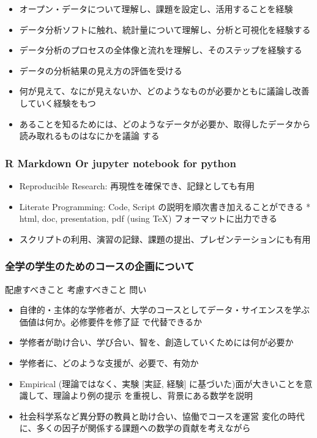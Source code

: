 \documentclass[
]{book}
\providecommand{\tightlist}{%
  \setlength{\itemsep}{0pt}\setlength{\parskip}{0pt}}
\theoremstyle{definition}
\theoremstyle{definition}
\theoremstyle{definition}
\theoremstyle{definition}
\theoremstyle{remark}
\begin{document}
\begin{itemize}
\tightlist
\item
  オープン・データについて理解し、課題を設定し、活用することを経験
\item
  データ分析ソフトに触れ、統計量について理解し、分析と可視化を経験する
\item
  データ分析のプロセスの全体像と流れを理解し、そのステップを経験する
\item
  データの分析結果の見え方の評価を受ける
\item
  何が見えて、なにが見えないか、どのようなものが必要かともに議論し改善していく経験をもつ
\item
  あることを知るためには、どのようなデータが必要か、取得したデータから読み取れるものはなにかを議論 する
\end{itemize}

\hypertarget{r-markdown-or-jupyter-notebook-for-python}{%
\subsubsection{R Markdown Or jupyter notebook for python}\label{r-markdown-or-jupyter-notebook-for-python}}

\begin{itemize}
\tightlist
\item
  Reproducible Research: 再現性を確保でき、記録としても有用
\item
  Literate Programming: Code, Script の説明を順次書き加えることができる * html, doc, presentation, pdf (using TeX) フォーマットに出力できる
\item
  スクリプトの利用、演習の記録、課題の提出、プレゼンテーションにも有用
\end{itemize}

\hypertarget{ux5168ux5b66ux306eux5b66ux751fux306eux305fux3081ux306eux30b3ux30fcux30b9ux306eux4f01ux753bux306bux3064ux3044ux3066}{%
\subsubsection{全学の学生のためのコースの企画について}\label{ux5168ux5b66ux306eux5b66ux751fux306eux305fux3081ux306eux30b3ux30fcux30b9ux306eux4f01ux753bux306bux3064ux3044ux3066}}

配慮すべきこと
考慮すべきこと 問い

\begin{itemize}
\tightlist
\item
  自律的・主体的な学修者が、大学のコースとしてデータ・サイエンスを学ぶ価値は何か。必修要件を修了証 で代替できるか
\item
  学修者が助け合い、学び合い、智を、創造していくためには何が必要か
\item
  学修者に、どのような支援が、必要で、有効か
\item
  Empirical (理論ではなく、実験 {[}実証, 経験{]} に基づいた)面が大きいことを意識して、理論より例の提示 を重視し、背景にある数学を説明
\item
  社会科学系など異分野の教員と助け合い、協働でコースを運営 変化の時代に、多くの因子が関係する課題への数学の貢献を考えながら
\end{itemize}
\end{document}
